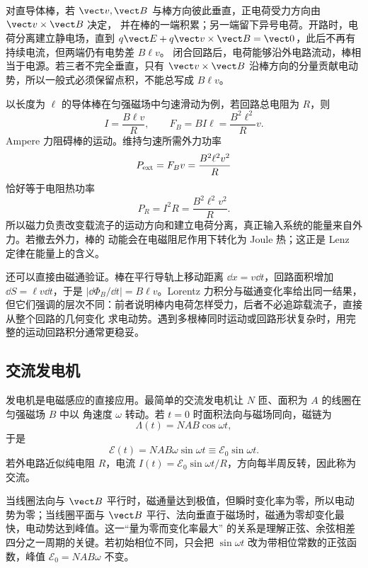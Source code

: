 对直导体棒，若 $\vect v,\vect B$ 与棒方向彼此垂直，正电荷受力方向由 $\vect v\times\vect B$ 决定，
并在棒的一端积累；另一端留下异号电荷。开路时，电荷分离建立静电场，直到
$q\vect E+q\vect v\times\vect B=\vect0$，此后不再有持续电流，但两端仍有电势差 $B\ell v$。
闭合回路后，电荷能够沿外电路流动，棒相当于电源。若三者不完全垂直，只有
$\vect v\times\vect B$ 沿棒方向的分量贡献电动势，所以一般式必须保留点积，不能总写成 $B\ell v$。

以长度为 $\ell$ 的导体棒在匀强磁场中匀速滑动为例，若回路总电阻为 $R$，则
\begin{equation}
  I=\frac{B\ell v}{R},\qquad
  F_B=BI\ell=\frac{B^2\ell^2}{R}v.
\end{equation}
Ampere 力阻碍棒的运动。维持匀速所需外力功率
\begin{equation}
  P_{\rm ext}=F_Bv=\frac{B^2\ell^2v^2}{R}
\end{equation}
恰好等于电阻热功率
\begin{equation}
  P_R=I^2R=\frac{B^2\ell^2v^2}{R}.
\end{equation}
所以磁力负责改变载流子的运动方向和建立电荷分离，真正输入系统的能量来自外力。若撤去外力，棒的
动能会在电磁阻尼作用下转化为 Joule 热；这正是 Lenz 定律在能量上的含义。

还可以直接由磁通验证。棒在平行导轨上移动距离 $\dd x=v\dd t$，回路面积增加
$\dd S=\ell v\dd t$，于是 $|\dd\Phi_B/\dd t|=B\ell v$。Lorentz 力积分与磁通变化率给出同一结果，
但它们强调的层次不同：前者说明棒内电荷怎样受力，后者不必追踪载流子，直接从整个回路的几何变化
求电动势。遇到多根棒同时运动或回路形状复杂时，用完整的运动回路积分通常更稳妥。

\motionalRodDiagram

\subsection*{交流发电机}

发电机是电磁感应的直接应用。最简单的交流发电机让 $N$ 匝、面积为 $A$ 的线圈在匀强磁场 $B$ 中以
角速度 $\omega$ 转动。若 $t=0$ 时面积法向与磁场同向，磁链为
\begin{equation}
  \Lambda(t)=NAB\cos\omega t,
\end{equation}
于是
\begin{equation}
  \boxed{\mathcal E(t)=NAB\omega\sin\omega t
  \equiv\mathcal E_0\sin\omega t}.
\end{equation}
若外电路近似纯电阻 $R$，电流 $I(t)=\mathcal E_0\sin\omega t/R$，方向每半周反转，因此称为交流。

当线圈法向与 $\vect B$ 平行时，磁通量达到极值，但瞬时变化率为零，所以电动势为零；当线圈平面与
$\vect B$ 平行、法向垂直于磁场时，磁通为零却变化最快，电动势达到峰值。这一“量为零而变化率最大”
的关系是理解正弦、余弦相差四分之一周期的关键。若初始相位不同，只会把
$\sin\omega t$ 改为带相位常数的正弦函数，峰值 $\mathcal E_0=NAB\omega$ 不变。

